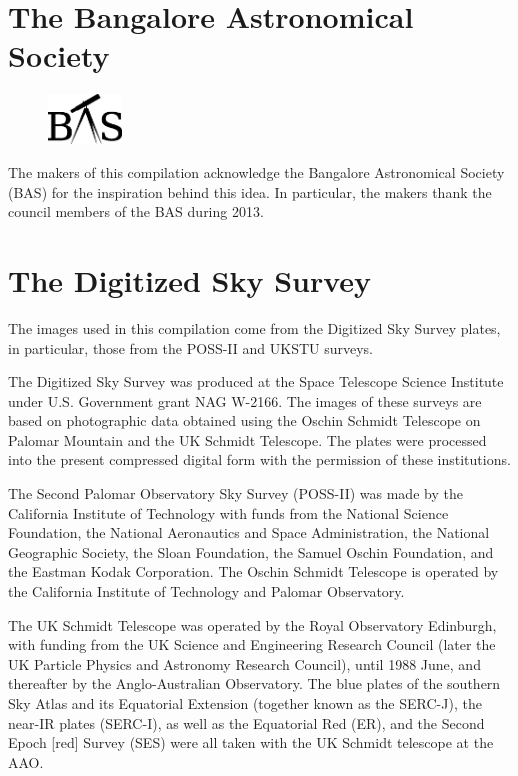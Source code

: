 \section*{The Bangalore Astronomical Society}
\begin{figure}
\vspace{-15pt}
\centering
\includegraphics[width=0.175\textwidth]{BASlogo.eps}
\vspace{-30pt}
\end{figure}
The makers of this compilation acknowledge the Bangalore Astronomical
Society (BAS) for the inspiration behind this idea. In particular, the
makers thank the council members of the BAS during 2013.\\
\vspace{10pt}
\section*{The Digitized Sky Survey}
The images used in this compilation come from the Digitized Sky Survey
plates, in particular, those from the POSS-II and UKSTU surveys.

The Digitized Sky Survey was produced at the Space Telescope Science
Institute under U.S. Government grant NAG W-2166. The images of these
surveys are based on photographic data obtained using the Oschin
Schmidt Telescope on Palomar Mountain and the UK Schmidt
Telescope. The plates were processed into the present compressed
digital form with the permission of these institutions.

The Second Palomar Observatory Sky Survey (POSS-II) was made by the
California Institute of Technology with funds from the National
Science Foundation, the National Aeronautics and Space Administration,
the National Geographic Society, the Sloan Foundation, the Samuel
Oschin Foundation, and the Eastman Kodak Corporation. The Oschin
Schmidt Telescope is operated by the California Institute of
Technology and Palomar Observatory.

The UK Schmidt Telescope was operated by the Royal Observatory
Edinburgh, with funding from the UK Science and Engineering Research
Council (later the UK Particle Physics and Astronomy Research
Council), until 1988 June, and thereafter by the Anglo-Australian
Observatory. The blue plates of the southern Sky Atlas and its
Equatorial Extension (together known as the SERC-J), the near-IR
plates (SERC-I), as well as the Equatorial Red (ER), and the Second
Epoch [red] Survey (SES) were all taken with the UK Schmidt telescope
at the AAO.


